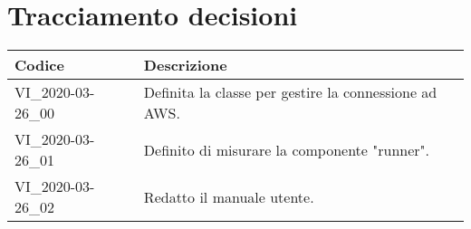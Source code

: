 \section{Tracciamento decisioni}
\renewcommand{\arraystretch}{1.8}

\begin{longtable}{|p{5cm}|p{8cm}|}
	\hline
	
	\rowcolor{header}
	\textbf{Codice} &  \textbf{Descrizione}\\
	
	\hline
	
	VI\_2020-03-26\_00 & Definita la classe per gestire la connessione ad AWS.\\
	VI\_2020-03-26\_01 & Definito di misurare la componente "runner".\\
	VI\_2020-03-26\_02 & Redatto il manuale utente.\\
	\hline
\end{longtable}